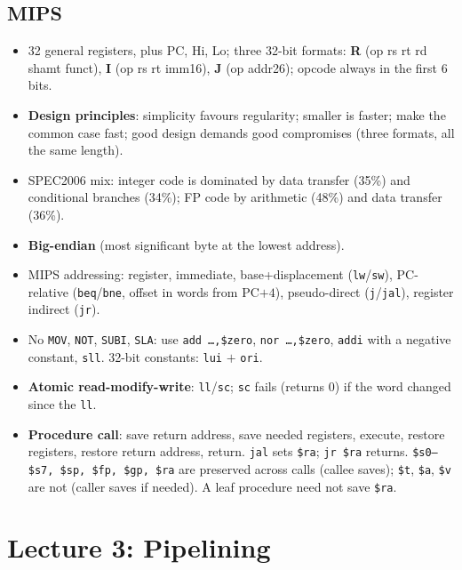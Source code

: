 \documentclass[11pt]{article}
\begin{document}
\subsection{MIPS}
\begin{itemize}[leftmargin=*]
  \item 32 general registers, plus PC, Hi, Lo; three 32-bit formats:
  \textbf{R} (op rs rt rd shamt funct), \textbf{I} (op rs rt imm16),
  \textbf{J} (op addr26); opcode always in the first 6 bits.
  \item \textbf{Design principles}: simplicity favours regularity; smaller
  is faster; make the common case fast; good design demands good compromises
  (three formats, all the same length).
  \item SPEC2006 mix: integer code is dominated by data transfer (35\%) and
  conditional branches (34\%); FP code by arithmetic (48\%) and data
  transfer (36\%).
  \item \textbf{Big-endian} (most significant byte at the lowest address).
  \item MIPS addressing: register, immediate, base+displacement
  (\texttt{lw}/\texttt{sw}), PC-relative (\texttt{beq}/\texttt{bne}, offset in
  words from PC$+4$), pseudo-direct (\texttt{j}/\texttt{jal}), register
  indirect (\texttt{jr}).
  \item No \texttt{MOV}, \texttt{NOT}, \texttt{SUBI}, \texttt{SLA}: use
  \texttt{add \dots,\$zero}, \texttt{nor \dots,\$zero}, \texttt{addi} with a
  negative constant, \texttt{sll}. 32-bit constants: \texttt{lui} $+$
  \texttt{ori}.
  \item \textbf{Atomic read-modify-write}: \texttt{ll}/\texttt{sc};
  \texttt{sc} fails (returns 0) if the word changed since the \texttt{ll}.
  \item \textbf{Procedure call}: save return address, save needed registers,
  execute, restore registers, restore return address, return.
  \texttt{jal} sets \texttt{\$ra}; \texttt{jr \$ra} returns. \texttt{\$s0--\$s7,
  \$sp, \$fp, \$gp, \$ra} are preserved across calls (callee saves);
  \texttt{\$t}, \texttt{\$a}, \texttt{\$v} are not (caller saves if needed). A
  leaf procedure need not save \texttt{\$ra}.
\end{itemize}

\section{Lecture 3: Pipelining}
\end{document}
